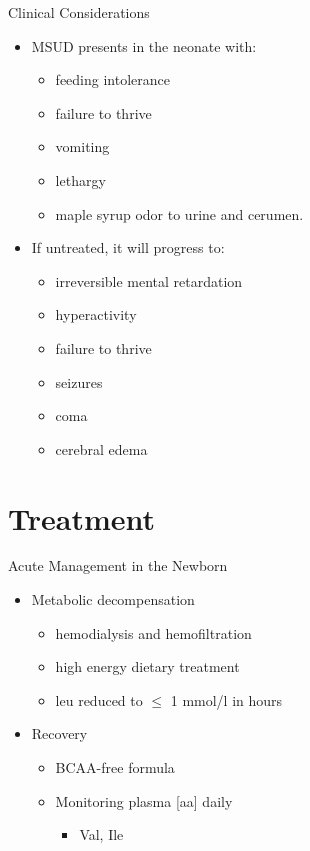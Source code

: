 \documentclass[presentation, smaller]{beamer}
\begin{document}
\begin{frame}[label={sec:orgheadline18}]{Clinical Considerations}
\begin{itemize}
\item MSUD presents in the neonate with:
\begin{itemize}
\item feeding intolerance
\item failure to thrive
\item vomiting
\item lethargy
\item maple syrup odor to urine and cerumen.
\end{itemize}
\item If untreated, it will progress to:
\begin{itemize}
\item irreversible mental retardation
\item hyperactivity
\item failure to thrive
\item seizures
\item coma
\item cerebral edema
\end{itemize}
\end{itemize}
\end{frame}


\section{Treatment}
\label{sec:orgheadline24}
\begin{frame}[label={sec:orgheadline20}]{Acute Management in the Newborn}
\begin{itemize}
\item Metabolic decompensation
\begin{itemize}
\item hemodialysis and hemofiltration
\item high energy dietary treatment
\item leu reduced to \(\le\) 1 mmol/l in hours
\end{itemize}
\item Recovery
\begin{itemize}
\item BCAA-free formula
\item Monitoring plasma [aa] daily
\begin{itemize}
\item Val, Ile
\end{itemize}
\end{itemize}
\end{itemize}
\end{frame}
\end{document}
